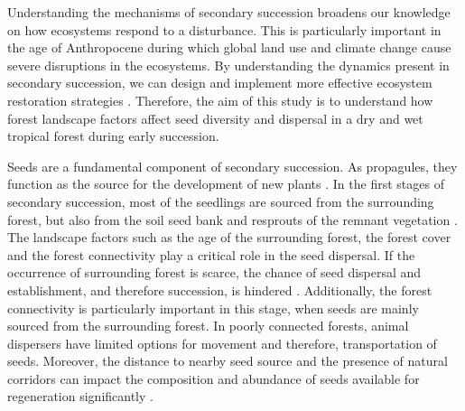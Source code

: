 

Understanding the mechanisms of secondary succession broadens our knowledge on how ecosystems respond to a disturbance. This is particularly important in the age of Anthropocene during which global land use and climate change cause severe disruptions in the ecosystems. By understanding the dynamics present in secondary succession, we can design and implement more effective ecosystem restoration strategies \citep{poorterSuccessionalTheories2023}. Therefore, the aim of this study is to understand how forest landscape factors affect seed diversity and dispersal in a dry and wet tropical forest during early succession. 

Seeds are a fundamental component of secondary succession. As propagules, they function as the source for the development of new plants \citep{poorterSuccessionalTheories2023}. In the first stages of secondary succession, most of the seedlings are sourced from the surrounding forest, but also from the soil seed bank and resprouts of the remnant vegetation \citep{huancanunezSeedrainsuccessionalFeedbacksWet2021}. The landscape factors such as the age of the surrounding forest, the forest cover and the forest connectivity play a critical role in the seed dispersal. If the occurrence of surrounding forest is scarce, the chance of seed dispersal and establishment, and therefore succession, is hindered \citep{hordijkLandUseHistory2024}. Additionally, the forest connectivity is particularly important in this stage, when seeds are mainly sourced from the surrounding forest. In poorly connected forests, animal dispersers have limited options for movement and therefore, transportation of seeds.  Moreover, the distance to nearby seed source and the presence of natural corridors can impact the composition and abundance of seeds available for regeneration significantly \citep{dentUnitingNicheDifferentiation2021, arroyo-rodriguezMultipleSuccessionalPathways2017}.

